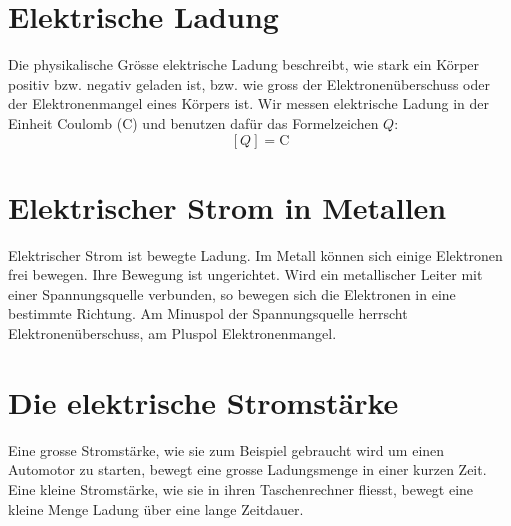 \documentclass[11pt,twoside=false,open=any]{scrbook}
\begin{document}
\section{Elektrische Ladung}
Die physikalische Grösse elektrische Ladung beschreibt, wie stark ein Körper positiv bzw. negativ geladen ist, bzw. wie gross der Elektronenüberschuss oder der Elektronenmangel eines Körpers ist. Wir messen elektrische Ladung in der Einheit Coulomb (\si{\coulomb}) und benutzen dafür das Formelzeichen $Q$:
\[ \left[ Q \right] = \si{\coulomb} \]


\section{Elektrischer Strom in Metallen}
Elektrischer Strom ist bewegte Ladung. Im Metall können sich einige Elektronen frei bewegen. Ihre Bewegung ist ungerichtet. Wird ein metallischer Leiter mit einer Spannungsquelle verbunden, so bewegen sich die Elektronen in eine bestimmte Richtung. Am Minuspol der Spannungsquelle herrscht Elektronenüberschuss, am Pluspol Elektronenmangel. 

\section{Die elektrische Stromstärke}
\begin{center}
   \setlength{\fboxrule}{2pt}
\end{center}

Eine grosse Stromstärke, wie sie zum Beispiel gebraucht wird um einen Automotor zu starten, bewegt eine grosse Ladungsmenge in einer kurzen Zeit. Eine kleine Stromstärke, wie sie in ihren Taschenrechner fliesst, bewegt eine kleine Menge Ladung über eine lange Zeitdauer.
\end{document}
